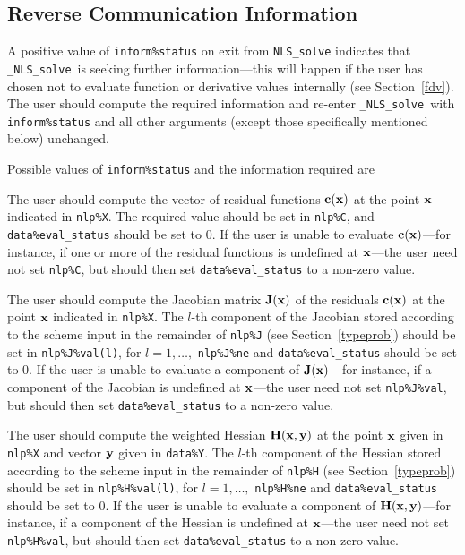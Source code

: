 \documentclass{galahad}
\newcommand{\packagename}{NLS}
\newcommand{\fullpackagename}{\libraryname\_\packagename}
\newcommand{\solver}{{\tt \fullpackagename\_solve}}
\begin{document}
\subsection{\label{reverse}Reverse Communication Information}

A positive value of {\tt inform\%status} on exit from
{\tt \packagename\_solve}
indicates that
\solver\ is seeking further information---this will happen
if the user has chosen not to evaluate function or
derivative values internally (see Section~\ref{fdv}).
The user should compute the required information and re-enter \solver\
with {\tt inform\%status} and all other arguments (except those specifically
mentioned below) unchanged.

Possible values of {\tt inform\%status} and the information required are
\begin{description}
 The user should compute the vector of residual functions
     ${\mathbf{c}}({\mathbf{x}})$ at the point ${\mathbf{x}}$ indicated in {\tt nlp\%X}.
     The required value should be set in {\tt nlp\%C}, and
     {\tt data\%eval\_status} should be set to 0. If the user is
     unable to evaluate ${\mathbf{c}}({\mathbf{x}})$---for instance, if one or more of the
     residual functions is undefined at ${\mathbf{x}}$---the user need not set
     {\tt nlp\%C}, but should then set {\tt data\%eval\_status}
     to a non-zero value.

 The user should compute the Jacobian matrix ${\mathbf{J}}({\mathbf{x}})$ of the
     residuals ${\mathbf{c}}({\mathbf{x}})$ at the point ${\mathbf{x}}$ indicated in {\tt nlp\%X}.
     The $l$-th component of the Jacobian stored according to the
     scheme input in the remainder of {\tt nlp\%J} (see Section~\ref{typeprob})
     should be set in {\tt nlp\%J\%val(l)}, for $l = 1, \ldots,$
     {\tt  nlp\%J\%ne} and {\tt data\%eval\_status} should be set to 0.
     If the user is unable to  evaluate a component of ${\mathbf{J}}({\mathbf{x}})$---for
     instance, if a component of the Jacobian is
     undefined at ${\mathbf{x}}$---the user need not set {\tt nlp\%J\%val}, but
     should then set {\tt data\%eval\_status} to a non-zero value.

 The user should compute the weighted Hessian ${\mathbf{H}}({\mathbf{x}},{\mathbf{y}})$
     at the point ${\mathbf{x}}$ given in {\tt nlp\%X} and vector ${\mathbf{y}}$ given in
     {\tt data\%Y}. The $l$-th component of the Hessian stored
     according to the scheme input in the remainder of {\tt nlp\%H}
     (see Section~\ref{typeprob}) should be set in {\tt nlp\%H\%val(l)},
     for $l = 1, \ldots,$ {\tt  nlp\%H\%ne} and
     {\tt data\%eval\_status} should be set to 0. If the user is
     unable to evaluate a component of ${\mathbf{H}}({\mathbf{x}},{\mathbf{y}})$---for instance,
     if a component of the Hessian is
     undefined at ${\mathbf{x}}$---the user need not set {\tt nlp\%H\%val}, but
     should then set {\tt data\%eval\_status} to a non-zero value.


\end{description}
\end{document}
